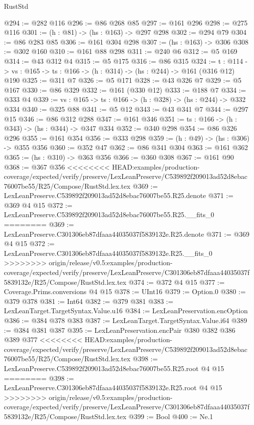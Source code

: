 \begin{lexlean}{RustStd}
\begin{coremodule}
{\begin{coremodule}
@294 := @282 @116
@296 := @86 @268 @85
@297 := @161 @296
@298 := @275 @116
@301 := (h : @81) -> (hs : @163) -> @297 @298
@302 := @294 @79
@304 := @86 @283 @85
@306 := @161 @304 @298
@307 := (hs : @163) -> @306
@308 := @302 @160
@310 := @161 @88 @298
@311 := @240 @6
@312 := @5 @169
@314 := @43 @312 @4
@315 := @5 @175
@316 := @86 @315
@324 := {t : @114} ->
  {vs : @165} -> {ts : @166} -> (h : @314) -> (hs : @244) -> @161 (@316 @12) @190
@325 := @311 @7
@326 := @5 @171
@328 := @43 @326 @7
@329 := @5 @167
@330 := @86 @329
@332 := @161 (@330 @12)
@333 := @188 @7
@334 := @333 @4
@339 := {vs : @165} -> {ts : @166} -> (h : @328) -> (hs : @244) -> @332 @334
@340 := @325 @88
@341 := @5 @12
@343 := @43 @341 @7
@344 := @297 @15
@346 := @86 @312 @288
@347 := @161 @346
@351 := {ts : @166} -> (h : @343) -> (hs : @344) -> @347 @334
@352 := @340 @298
@354 := @86 @326 @296
@355 := @161 @354
@356 := @333 @298
@359 := (h : @49) -> (hs : @306) -> @355 @356
@360 := @352 @47
@362 := @86 @341 @304
@363 := @161 @362
@365 := (hs : @310) -> @363 @356
@366 := @360 @308
@367 := @161 @90
@368 := @367 @356
<<<<<<<< HEAD:examples/production-coverage/expected/verify/preserve/LexLeanPreserve/C539892f209013ad52d8ebac76007be55/R25/Compose/RustStd.lex.tex
@369 := LexLeanPreserve.C539892f209013ad52d8ebac76007be55.R25.denote
@371 := @369 @4 @15
@372 := LexLeanPreserve.C539892f209013ad52d8ebac76007be55.R25.__fits_0
========
@369 := LexLeanPreserve.C301306eb87dfaaa44035037f5839132e.R25.denote
@371 := @369 @4 @15
@372 := LexLeanPreserve.C301306eb87dfaaa44035037f5839132e.R25.__fits_0
>>>>>>>> origin/release/v0.5:examples/production-coverage/expected/verify/preserve/LexLeanPreserve/C301306eb87dfaaa44035037f5839132e/R25/Compose/RustStd.lex.tex
@374 := @372 @4 @15
@377 := Coverage.Prims.conversions @4 @15
@378 := UInt16
@379 := Option.{0}
@380 := @379 @378
@381 := Int64
@382 := @379 @381
@383 := LexLeanTarget.TargetSyntax.Value.u16
@384 := LexLeanPreservation.encOption
@386 := @384 @378 @383
@387 := LexLeanTarget.TargetSyntax.Value.i64
@389 := @384 @381 @387
@395 := LexLeanPreservation.encPair @380 @382 @386 @389 @377
<<<<<<<< HEAD:examples/production-coverage/expected/verify/preserve/LexLeanPreserve/C539892f209013ad52d8ebac76007be55/R25/Compose/RustStd.lex.tex
@398 := LexLeanPreserve.C539892f209013ad52d8ebac76007be55.R25.root @4 @15
========
@398 := LexLeanPreserve.C301306eb87dfaaa44035037f5839132e.R25.root @4 @15
>>>>>>>> origin/release/v0.5:examples/production-coverage/expected/verify/preserve/LexLeanPreserve/C301306eb87dfaaa44035037f5839132e/R25/Compose/RustStd.lex.tex
@399 := Bool
@400 := Ne.{1}

\end{coremodule}}
\end{coremodule}
\end{lexlean}
